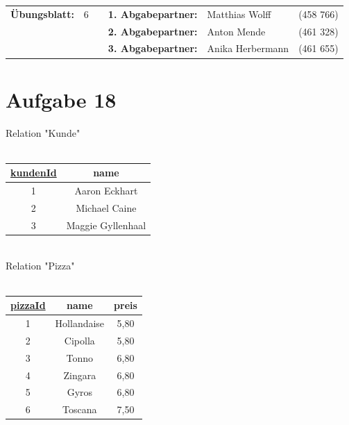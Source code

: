\newcommand{\obenlinks}{Software Engineering}		%

\usepackage{float}


	\begin{center}
		\begin{tabular}{|rlp{4cm}rll|}
		\hline
		 \textbf{Übungsblatt:} & 6 &   & \textbf{1. Abgabepartner:} & Matthias Wolff & (458 766)  \\
		        & & & \textbf{2. Abgabepartner:} & Anton Mende & (461 328) \\
		        & & & \textbf{3. Abgabepartner:} & Anika Herbermann & (461 655) \\ \hline
		\end{tabular}
	\end{center}




\section*{Aufgabe 18}
Relation "Kunde"\\ \\
\begin{tabular} {|c|c|}
\rowcolor{Gray}\hline
\cellcolor{red!25}\underline{kundenId} \phantom{a}&name\\\hline
1&Aaron Eckhart\\\hline
2&Michael Caine\\\hline
3&Maggie Gyllenhaal\\\hline
\end{tabular}\\

Relation "Pizza"\\ \\
\begin{tabular} {|c|c|c|}
	\rowcolor{Gray}\hline 
	\cellcolor{blue!25}\underline{pizzaId}&name&preis\\\hline
	1&Hollandaise&5,80\\\hline
	2&Cipolla&5,80\\\hline
	3&Tonno&6,80\\\hline
	4&Zingara&6,80\\\hline
	5&Gyros&6,80\\\hline
	6&Toscana&7,50\\\hline
\end{tabular}\\

